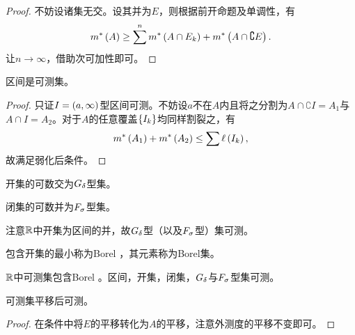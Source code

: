 \documentclass{ctexrep}
\begin{document}
  \begin{proof}
    不妨设诸集无交。设其并为$E$，则根据前开命题及单调性，有
    \[ m^*\left(A\right) \ge \sum^n m^*\left(A\cap E_k\right) + m^*\left(A\cap\complement E\right). \]
    让$n\to\infty$，借助次可加性即可。
  \end{proof}
  \begin{theorem}
    区间是可测集。
  \end{theorem}
  \begin{proof}
    只证$I=\left(a,\infty\right)$型区间可测。不妨设$a$不在$A$内且将之分割为$A\cap \complement I = A_1$与$A \cap I = A_2$。对于$A$的任意覆盖$\left\{I_k\right\}$均同样割裂之，有
    \[ m^*\left(A_1\right) + m^*\left(A_2\right) \le \sum \ell\left(I_k\right), \]
    故满足弱化后条件。
  \end{proof}
  \begin{definition}
    开集的可数交为$G_\delta$型集。
  \end{definition}
  \begin{definition}
    闭集的可数并为$F_\sigma$型集。
  \end{definition}
  注意$\mathbb{R}$中开集为区间的并，故$G_\delta$型（以及$F_\sigma$型）集可测。
  \begin{definition}
    包含开集的最小\siga 称为Borel \siga ，其元素称为Borel集。
  \end{definition}
  \begin{theorem}
    $\mathbb{R}$中可测集包含Borel \siga 。区间，开集，闭集，$G_\delta$与$F_\sigma$型集可测。
  \end{theorem}
  \begin{proposition}
    可测集平移后可测。
  \end{proposition}
  \begin{proof}
    在\cara 条件中将$E$的平移转化为$A$的平移，注意外测度的平移不变即可。
  \end{proof}
\end{document}
